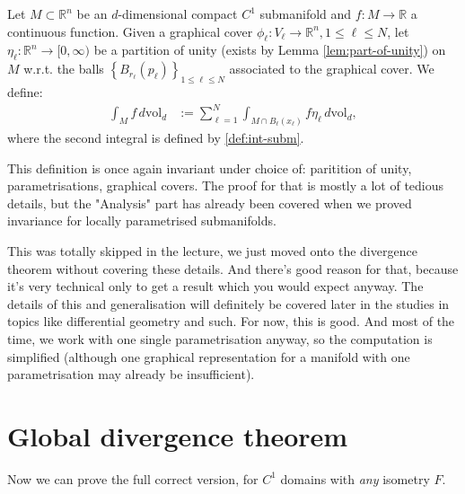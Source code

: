 \begin{definition}\label{def:int-over-comp-subm}
	Let $M \subset \mathbb{R}^n$ be an $d$-dimensional compact $C^1$ submanifold and $f: M \rightarrow \mathbb{R}$ a continuous function.
	Given a graphical cover $\phi_{\ell}: V_{\ell} \rightarrow \mathbb{R}^n, 1 \leq \ell \leq N$, let $\eta_{\ell}: \mathbb{R}^n \rightarrow[0, \infty)$ be a partition of unity (exists by Lemma \ref{lem:part-of-unity}) on $M$ w.r.t. the balls $\left\{B_{r_{\ell}}\left(p_{\ell}\right)\right\}_{1 \leq \ell \leq N}$ associated to the graphical cover. We define:
	$$
		\begin{aligned}
			\int_M f \, d \text{vol}_d & :=\sum_{\ell=1}^N \int_{M \cap B_{\ell}\left(x_{\ell}\right)} f \eta_{\ell} \, d \text{vol}_d,
		\end{aligned}
	$$
    where the second integral is defined by \ref{def:int-subm}. 

    This definition is once again invariant under choice of: paritition of unity, parametrisations, graphical covers. The proof for that is mostly a lot of tedious details, but the "Analysis" part has already been covered when we proved invariance for locally parametrised submanifolds. 
\end{definition}

This was totally skipped in the lecture, we just moved onto the divergence theorem without covering these details. And there's good reason for that, because it's very technical only to get a result which you would expect anyway. The details of this and generalisation will definitely be covered later in the studies in topics like differential geometry and such. For now, this is good. And most of the time, we work with one single parametrisation anyway, so the computation is simplified (although one graphical representation for a manifold with one parametrisation may already be insufficient).

\section{Global divergence theorem}

Now we can prove the full correct version, for $C^{1}$ domains with \textit{any} isometry $F$. 

